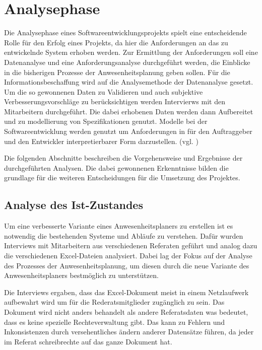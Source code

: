 \section{Analysephase}
\label{sec:Analysephase}
Die Analysephase eines Softwareentwicklungsprojekts spielt eine entscheidende Rolle für den Erfolg eines Projekts, da hier die Anforderungen an das zu entwickelnde System erhoben werden. Zur Ermittlung der Anforderungen soll eine Datenanalyse und eine Anforderungsanalyse durchgeführt werden, die Einblicke in die bisherigen Prozesse der Anwesenheitsplanung geben sollen. Für die Informationsbeschaffung wird auf die Analysemethode der Datenanalyse gesetzt. Um die so gewonnenen Daten zu Validieren und auch subjektive Verbesserungsvorschläge zu berücksichtigen werden Intervierws mit den Mitarbeitern durchgeführt. Die dabei erhobenen Daten werden dann Aufbereitet und zu modellierung von Spezifikationen genutzt. Modelle bei der Softwareentwicklung werden genutzt um Anforderungen in für den Auftraggeber und den Entwickler interpretierbarer Form darzustellen. (vgl. \cite[S. 43]{dumke-2003})

Die folgenden Abschnitte beschreiben die Vorgehensweise und Ergebnisse der durchgeführten Analysen. Die dabei gewonnenen Erkenntnisse bilden die grundlage für die weiteren Entscheidungen für die Umsetzung des Projektes.


\subsection{Analyse des Ist-Zustandes}
\label{sec:Ist-Zustand}
Um eine verbesserte Variante eines Anwesenheitsplaners zu erstellen ist es notwendig die bestehenden Systeme und Abläufe zu verstehen. Dafür wurden Interviews mit Mitarbeitern aus verschiedenen Referaten geführt und analog dazu die verschiedenen Excel-Dateien analysiert. Dabei lag der Fokus auf der Analyse des Prozesses der Anwesenheitsplanung, um diesen durch die neue Variante des Anwesenheitsplaners bestmöglich zu unterstützen.

Die Interviews ergaben, dass das Excel-Dokument meist in einem Netzlaufwerk aufbewahrt wird um für die Rederatsmitglieder zugänglich zu sein. Das Dokument wird nicht anders behandelt als andere Referatsdaten was bedeutet, dass es keine spezielle Rechteverwaltung gibt. Das kann zu Fehlern und Inkonsistenzen durch versehentliches ändern anderer Datensätze führen, da jeder im Referat schreibrechte auf das ganze Dokument hat.

